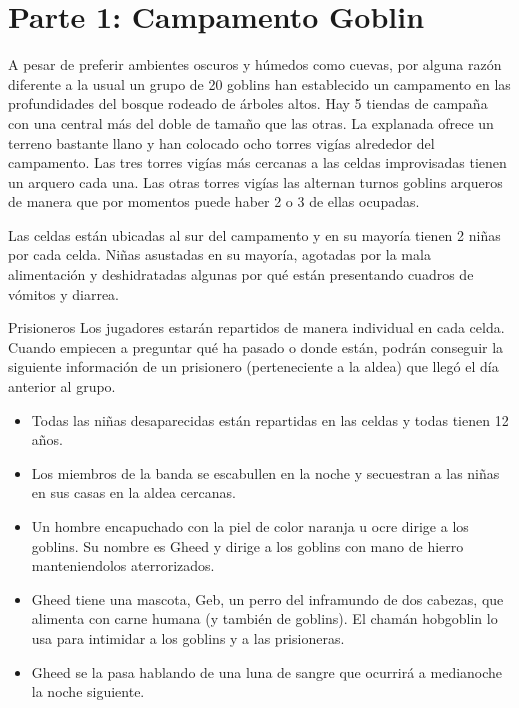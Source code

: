 \documentclass[10pt,twoside,twocolumn,openany]{dndbook}
\begin{document}
\section{Parte 1: Campamento Goblin}

A pesar de preferir ambientes oscuros y húmedos como cuevas, por alguna razón diferente a la usual un grupo de 20 goblins han establecido un campamento en las profundidades del bosque rodeado de árboles altos. Hay 5 tiendas de campaña con una central más del doble de tamaño que las otras. La explanada ofrece un terreno bastante llano y han colocado ocho torres vigías alrededor del campamento. Las tres torres vigías más cercanas a las celdas improvisadas tienen un arquero cada una. Las otras torres vigías las alternan turnos goblins arqueros de manera que por momentos puede haber 2 o 3 de ellas ocupadas.

Las celdas están ubicadas al sur del campamento y en su mayoría tienen 2 niñas por cada celda. Niñas asustadas en su mayoría, agotadas por la mala alimentación y deshidratadas algunas por qué están presentando cuadros de vómitos y diarrea.

\begin{DndComment}{Prisioneros}
Los jugadores estarán repartidos de manera individual en cada celda. Cuando empiecen a preguntar qué ha pasado o donde están, podrán conseguir la siguiente información de un prisionero (perteneciente a la aldea) que llegó el día anterior al grupo.

\begin{itemize}
  \item Todas las niñas desaparecidas están repartidas en las celdas y todas tienen 12 años.
  \item Los miembros de la banda se escabullen en la noche y secuestran a las niñas en sus casas en la aldea cercanas.
  \item Un hombre encapuchado con la piel de color naranja u ocre dirige a los goblins. Su nombre es Gheed y dirige a los goblins con mano de hierro manteniendolos aterrorizados.
  \item Gheed tiene una mascota, Geb, un perro del inframundo de dos cabezas, que alimenta con carne humana (y también de goblins). El chamán hobgoblin lo usa para intimidar a los goblins y a las prisioneras.
  \item Gheed se la pasa hablando de una luna de sangre que ocurrirá a medianoche la noche siguiente.
\end{itemize}

\end{DndComment}
\end{document}
